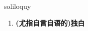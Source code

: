 
\begin{frame}
{\huge soliloquy}
\begin{center}
\begin{enumerate}\Large
  \item \textbf{(尤指自言自语的)独白}
\end{enumerate}
\end{center}
\end{frame}
